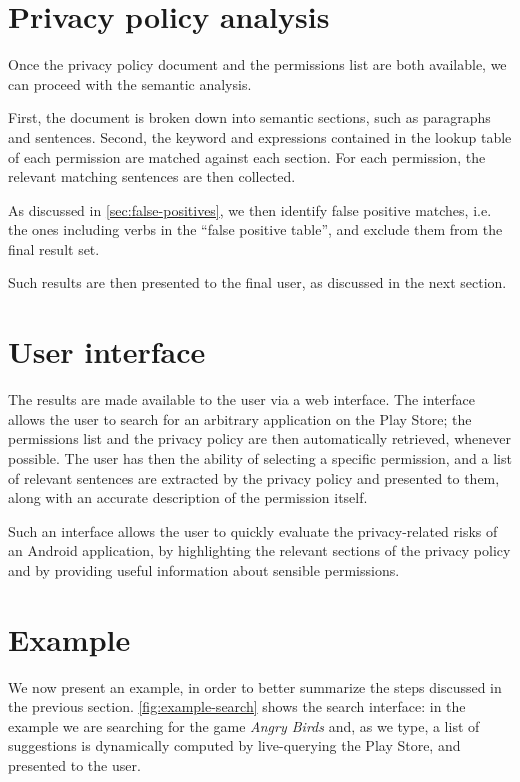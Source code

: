 \section{Privacy policy analysis}
\label{sec:privacy-policy-analysis}
Once the privacy policy document and the permissions list are both available, we can proceed with the semantic analysis.

First, the document is broken down into semantic sections, such as paragraphs and sentences.
Second, the keyword and expressions contained in the lookup table of each permission are matched against each section.
For each permission, the relevant matching sentences are then collected.

As discussed in \autoref{sec:false-positives}, we then identify false positive matches, i.e. the ones including verbs in the ``false positive table'', and exclude them from the final result set.

Such results are then presented to the final user, as discussed in the next section.

\section{User interface}
The results are made available to the user via a web interface. The interface allows the user to search for an arbitrary application on the Play Store; the permissions list and the privacy policy are then automatically retrieved, whenever possible.
The user has then the ability of selecting a specific permission, and a list of relevant sentences are extracted by the privacy policy and presented to them, along with an accurate description of the permission itself.

Such an interface allows the user to quickly evaluate the privacy-related risks of an Android application, by highlighting the relevant sections of the privacy policy and by providing useful information about sensible permissions.

\section{Example}
We now present an example, in order to better summarize the steps discussed in the previous section.
\autoref{fig:example-search} shows the search interface: in the example we are searching for the game \emph{Angry Birds} and, as we type, a list of suggestions is dynamically computed by live-querying the Play Store, and presented to the user.


